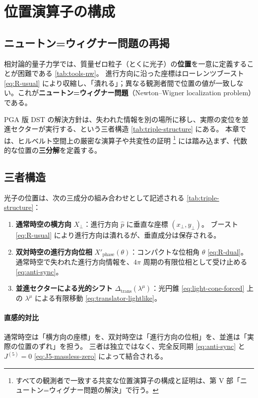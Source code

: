 \documentclass[dvipdfmx,a4paper,oneside]{jsbook}
\numberwithin{equation}{chapter}
\begin{document}
\section{位置演算子の構成}

\subsection{ニュートン=ウィグナー問題の再掲}

相対論的量子力学では、質量ゼロ粒子（とくに光子）の\textbf{位置}を一意に定義することが困難である \eqref{tab:tools-nw}。
進行方向に沿った座標はローレンツブースト \eqref{eq:R-usual} により収縮し、「潰れる」；異なる観測者間で位置の値が一致しない。これが\textbf{ニュートン=ウィグナー問題}（Newton–Wigner localization problem）である。

PGA 版 DST の解決方針は、失われた情報を別の場所に移し、実際の変位を並進セクターが実行する、という三者構造 \eqref{tab:triple-structure} にある。
本章では、ヒルベルト空間上の厳密な演算子や共変性の証明 \footnote{すべての観測者で一致する共変な位置演算子の構成と証明は、第 V 部「ニュートン=ウィグナー問題の解決」で行う。} には踏み込まず、代数的な位置の\textbf{三分解}を定義する。

\subsection{三者構造}

光子の位置は、次の三成分の組み合わせとして記述される \eqref{tab:triple-structure}：

\begin{enumerate}[leftmargin=2em]
  \item \textbf{通常時空の横方向} \(X_\perp\)：進行方向 \(\hat{p}\) に垂直な座標 \((x_\perp, y_\perp)\)。
  ブースト \eqref{eq:R-usual} により進行方向は潰れるが、垂直成分は保存される。
  \item \textbf{双対時空の進行方向位相} \(X'_{\mathrm{phase}}(\theta)\)：コンパクトな位相角 \(\theta\) \eqref{eq:R-dual}。
  通常時空で失われた進行方向情報を、\(4\pi\) 周期の有限位相として受け止める \eqref{eq:anti-sync}。
  \item \textbf{並進セクターによる光的シフト} \(\Delta_{\mathrm{trans}}(\lambda^\mu)\)：光円錐 \eqref{eq:light-cone-forced} 上の \(\lambda^\mu\) による有限移動 \eqref{eq:translator-lightlike}。
\end{enumerate}

\paragraph{直感的対比}
通常時空は「横方向の座標」を、双対時空は「進行方向の位相」を、並進は「実際の位置のずれ」を担う。
三者は独立ではなく、完全反同期 \eqref{eq:anti-sync} と \(J^{(5)} = 0\) \eqref{eq:J5-massless-zero} によって結合される。
\end{document}
